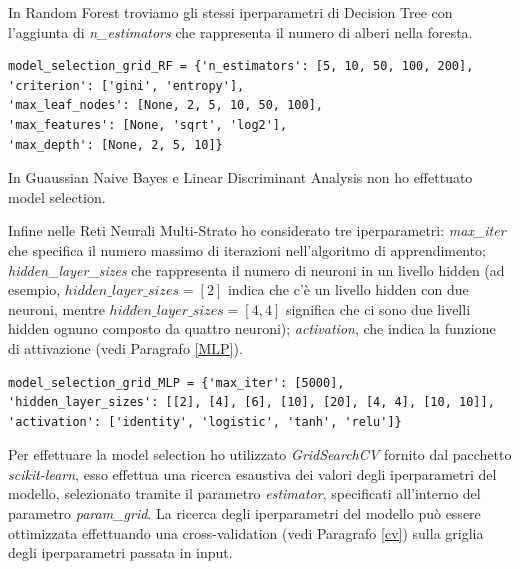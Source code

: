 \documentclass[12pt,italian]{report}
\begin{document}
\newpage
In Random Forest troviamo gli stessi iperparametri di Decision Tree con l'aggiunta di \emph{n\_estimators} che rappresenta il numero di  alberi nella foresta.

\begin{lstlisting}[frame=single, basicstyle=\footnotesize]
model_selection_grid_RF = {'n_estimators': [5, 10, 50, 100, 200],
'criterion': ['gini', 'entropy'],
'max_leaf_nodes': [None, 2, 5, 10, 50, 100],
'max_features': [None, 'sqrt', 'log2'],
'max_depth': [None, 2, 5, 10]}
\end{lstlisting}


In Guaussian Naive Bayes e Linear Discriminant Analysis non ho effettuato model selection.

Infine nelle Reti Neurali Multi-Strato ho considerato tre iperparametri: \emph{max\_iter} che specifica il numero massimo di iterazioni nell'algoritmo di apprendimento; \emph{hidden\_layer\_sizes} che rappresenta il numero di neuroni in un livello hidden (ad esempio, $hidden\_layer\_sizes=[2]$ indica che c'è un livello hidden con due neuroni, mentre $hidden\_layer\_sizes=[4, 4]$ significa che ci sono due livelli hidden ognuno composto da quattro neuroni); \emph{activation}, che indica la funzione di attivazione (vedi Paragrafo \ref{MLP}).
\begin{lstlisting}[frame=single, basicstyle=\footnotesize]
model_selection_grid_MLP = {'max_iter': [5000],
'hidden_layer_sizes': [[2], [4], [6], [10], [20], [4, 4], [10, 10]],
'activation': ['identity', 'logistic', 'tanh', 'relu']}
\end{lstlisting}


Per effettuare la model selection ho utilizzato \emph{GridSearchCV} fornito dal pacchetto \emph{scikit-learn}, esso effettua una ricerca esaustiva dei valori degli iperparametri del modello, selezionato tramite il parametro \emph{estimator}, specificati all'interno del parametro \emph{param\_grid}. La ricerca degli iperparametri del modello può essere ottimizzata effettuando una cross-validation (vedi Paragrafo \ref{cv}) sulla griglia degli iperparametri passata in input.
\end{document}

